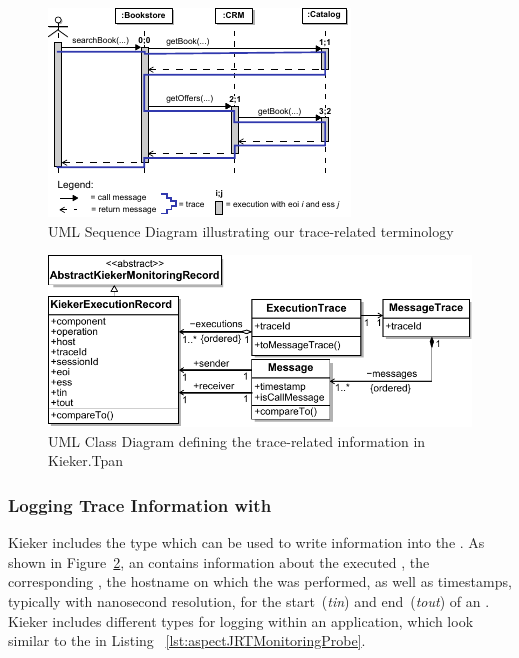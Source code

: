 \begin{figure}\centering
\includegraphics[width=0.96\columnwidth]{figures/eoiessBookstoreDemo-extended-2-combined}
\caption{UML Sequence Diagram illustrating our trace-related terminology}
\label{fig:exampleTraceTerminology}
\end{figure}

\begin{figure}\centering
\includegraphics[width=1\columnwidth]{figures/kiekerTraceRepresentations-refined-bw}%
\caption{UML Class Diagram defining the trace-related information in Kieker.Tpan}
\label{fig:kiekerTraceRepresentations}
\end{figure}

\subsubsection{Logging Trace Information with \KiekerTpmon{}}

Kieker includes the \MonitoringRecord{} type \KiekerExecutionRecord{} which can %
be used to write \execution{} information into the \MonitoringLog{}. %
As shown in Figure~\ref{fig:kiekerTraceRepresentations}, an \KiekerExecutionRecord{} %
contains information about the executed \operation{}, the corresponding \component{}, 
the hostname on which the \execution{} was performed, as well as timestamps, %
typically with nanosecond resolution, for the start~(\textit{tin}) and end~(\textit{tout}) %
of an \execution{}. %
Kieker includes different \MonitoringProbe{} types for logging \KiekerExecutionRecords{} %
within an application, which look similar to the \MonitoringProbe{} in Listing~%
\ref{lst:aspectJRTMonitoringProbe}. %

